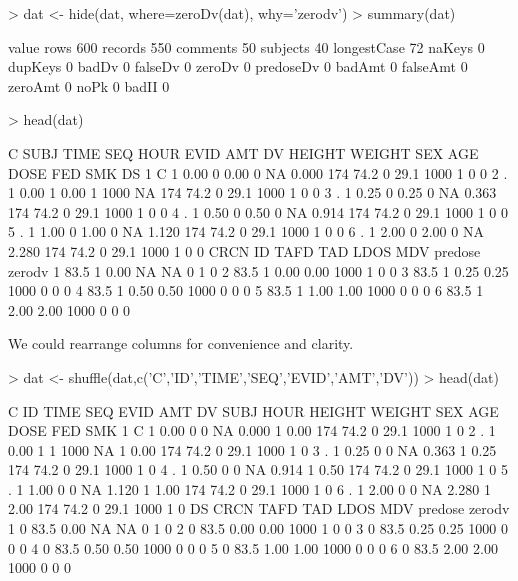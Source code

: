 \begin{Schunk}
\begin{Sinput}
> dat <- hide(dat, where=zeroDv(dat), why='zerodv')
> summary(dat)
\end{Sinput}
\begin{Soutput}
            value
rows          600
records       550
comments       50
subjects       40
longestCase    72
naKeys          0
dupKeys         0
badDv           0
falseDv         0
zeroDv          0
predoseDv       0
badAmt          0
falseAmt        0
zeroAmt         0
noPk            0
badII           0
\end{Soutput}
\begin{Sinput}
> head(dat)
\end{Sinput}
\begin{Soutput}
  C SUBJ TIME SEQ HOUR EVID  AMT    DV HEIGHT WEIGHT SEX  AGE DOSE FED SMK DS
1 C    1 0.00   0 0.00    0   NA 0.000    174   74.2   0 29.1 1000   1   0  0
2 .    1 0.00   1 0.00    1 1000    NA    174   74.2   0 29.1 1000   1   0  0
3 .    1 0.25   0 0.25    0   NA 0.363    174   74.2   0 29.1 1000   1   0  0
4 .    1 0.50   0 0.50    0   NA 0.914    174   74.2   0 29.1 1000   1   0  0
5 .    1 1.00   0 1.00    0   NA 1.120    174   74.2   0 29.1 1000   1   0  0
6 .    1 2.00   0 2.00    0   NA 2.280    174   74.2   0 29.1 1000   1   0  0
  CRCN ID TAFD  TAD LDOS MDV predose zerodv
1 83.5  1 0.00   NA   NA   0       1      0
2 83.5  1 0.00 0.00 1000   1       0      0
3 83.5  1 0.25 0.25 1000   0       0      0
4 83.5  1 0.50 0.50 1000   0       0      0
5 83.5  1 1.00 1.00 1000   0       0      0
6 83.5  1 2.00 2.00 1000   0       0      0
\end{Soutput}
\end{Schunk}
We could rearrange columns for convenience and clarity.
\begin{Schunk}
\begin{Sinput}
> dat <- shuffle(dat,c('C','ID','TIME','SEQ','EVID','AMT','DV'))
> head(dat)
\end{Sinput}
\begin{Soutput}
  C ID TIME SEQ EVID  AMT    DV SUBJ HOUR HEIGHT WEIGHT SEX  AGE DOSE FED SMK
1 C  1 0.00   0    0   NA 0.000    1 0.00    174   74.2   0 29.1 1000   1   0
2 .  1 0.00   1    1 1000    NA    1 0.00    174   74.2   0 29.1 1000   1   0
3 .  1 0.25   0    0   NA 0.363    1 0.25    174   74.2   0 29.1 1000   1   0
4 .  1 0.50   0    0   NA 0.914    1 0.50    174   74.2   0 29.1 1000   1   0
5 .  1 1.00   0    0   NA 1.120    1 1.00    174   74.2   0 29.1 1000   1   0
6 .  1 2.00   0    0   NA 2.280    1 2.00    174   74.2   0 29.1 1000   1   0
  DS CRCN TAFD  TAD LDOS MDV predose zerodv
1  0 83.5 0.00   NA   NA   0       1      0
2  0 83.5 0.00 0.00 1000   1       0      0
3  0 83.5 0.25 0.25 1000   0       0      0
4  0 83.5 0.50 0.50 1000   0       0      0
5  0 83.5 1.00 1.00 1000   0       0      0
6  0 83.5 2.00 2.00 1000   0       0      0
\end{Soutput}
\end{Schunk}

